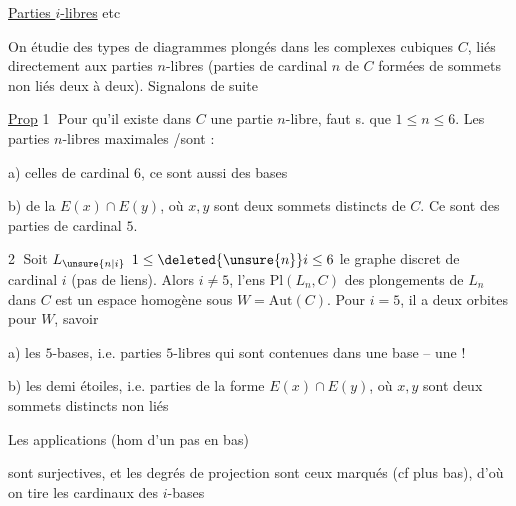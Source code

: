 \uline{Parties $i$-libres} etc

On étudie des types de diagrammes plongés dans les complexes cubiques $C$, liés directement aux parties $n$-libres  (parties de cardinal $n$ de $C$ formées de sommets non liés deux à deux). Signalons  de suite

\uline{Prop} \textcircled{1} Pour qu'il existe dans $C$ une partie $n$-libre,  faut s. que $1\leq n\leq6$. Les parties $n$-libres maximales /sont : 

a) celles de cardinal $6$, ce sont aussi des bases

b)   de la  $E(x)\cap E(y)$, où $x,y$ sont deux sommets distincts  de $C$. Ce sont des parties de cardinal $5$.

\textcircled{2} Soit $L_{\unsure{n|i}}$ \quad $1\leq\deleted{\unsure{n}}i\leq6$ le graphe discret \inserted{$[1,i]$} de cardinal $i$ (pas de liens). Alors  $i\ne5$, l'ens $\mathrm{Pl}(L_n,C)$ des plongements de $L_n$ dans $C$ est un espace homogène sous $W=\mathrm{Aut}(C)$. Pour $i=5$, il a deux orbites  pour $W$, savoir

a) les $5$-bases, i.e. parties $5$-libres qui sont contenues dans une base -- une !

b) les demi étoiles, i.e. parties de la forme $E(x)\cap E(y)$, où $x,y$ sont deux sommets distincts non liés

Les applications  (hom d'un pas en bas)


sont surjectives, et les degrés de projection sont   ceux marqués (cf  plus bas), d'où on tire les cardinaux des $i$-bases 

